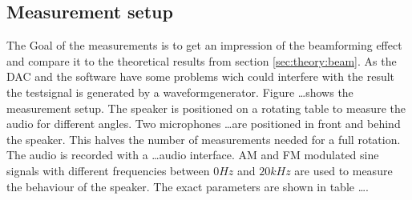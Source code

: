 \subsection{Measurement setup}

The Goal of the measurements is to get an impression of the beamforming effect and compare it to the theoretical results from section \ref{sec:theory:beam}. As the DAC and the software have some problems wich could interfere with the result the testsignal is generated by a waveformgenerator. Figure \dots shows the measurement setup.\p
%
The speaker is positioned on a rotating table to measure the audio for different angles. Two microphones \dots are positioned in front and behind the speaker. This halves the number of measurements needed for a full rotation. The audio is recorded with a \dots audio interface.\p
%
AM and FM modulated sine signals with different frequencies between $0Hz$ and $20kHz$ are used to measure the behaviour of the speaker. The exact parameters are shown in table \dots.